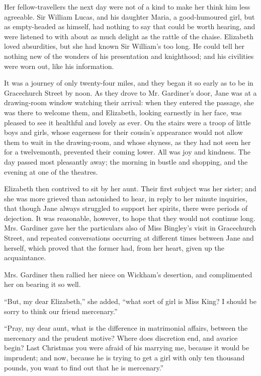 \documentclass[12pt,openright]{book}
\begin{document}
Her fellow-travellers the next day were not of a kind to make her think him less agreeable. Sir William Lucas, and his daughter Maria, a good-humoured girl, but as empty-headed as himself, had nothing to say that could be worth hearing, and were listened to with about as much delight as the rattle of the chaise. Elizabeth loved absurdities, but she had known Sir William’s too long. He could tell her nothing new of the wonders of his presentation and knighthood; and his civilities were worn out, like his information.

It was a journey of only twenty-four miles, and they began it so early as to be in Gracechurch Street by noon. As they drove to Mr. Gardiner’s door, Jane was at a drawing-room window watching their arrival: when they entered the passage, she was there to welcome them, and Elizabeth, looking earnestly in her face, was pleased to see it healthful and lovely as ever. On the stairs were a troop of little boys and girls, whose eagerness for their cousin’s appearance would not allow them to wait in the drawing-room, and whose shyness, as they had not seen her for a twelvemonth, prevented their coming lower. All was joy and kindness. The day passed most pleasantly away; the morning in bustle and shopping, and the evening at one of the theatres.

Elizabeth then contrived to sit by her aunt. Their first subject was her sister; and she was more grieved than astonished to hear, in reply to her minute inquiries, that though Jane always struggled to support her spirits, there were periods of dejection. It was reasonable, however, to hope that they would not continue long. Mrs. Gardiner gave her the particulars also of Miss Bingley’s visit in Gracechurch Street, and repeated conversations occurring at different times between Jane and herself, which proved that the former had, from her heart, given up the acquaintance.

Mrs. Gardiner then rallied her niece on Wickham’s desertion, and complimented her on bearing it so well.

“But, my dear Elizabeth,” she added, “what sort of girl is Miss King? I should be sorry to think our friend mercenary.”

“Pray, my dear aunt, what is the difference in matrimonial affairs, between the mercenary and the prudent motive? Where does discretion end, and avarice begin? Last Christmas you were afraid of his marrying me, because it would be imprudent; and now, because he is trying to get a girl with only ten thousand pounds, you want to find out that he is mercenary.”
\end{document}
